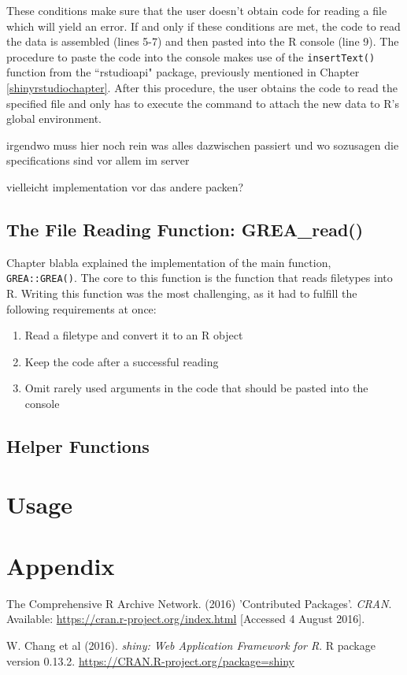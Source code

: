 \documentclass[12pt]{article} %
\newcommand{\li}{\lstinline}
\begin{document}
These conditions make sure that the user doesn't obtain code for reading a file which will yield an error. If and only if these conditions are met, the code to read the data is assembled (lines 5-7)  and then pasted into the R console (line 9). The procedure to paste the code into the console makes use of the \li{insertText()} function from the ``rstudioapi" package, previously mentioned in Chapter \ref{shinyrstudiochapter}. After this procedure, the user obtains the code to read the specified file and only has to execute the command to attach the new data to R's global environment.

irgendwo muss hier noch rein was alles dazwischen passiert und wo sozusagen die specifications sind vor allem im server

vielleicht implementation vor das andere packen?

\subsection{The File Reading Function: \textrm{GREA\_read()}}
Chapter blabla explained the implementation of the main function, \li{GREA::GREA()}. The core to this function is the function that reads filetypes into R.
Writing this function was the most challenging, as it had to fulfill the following requirements at once:
\begin{enumerate}
\item Read a filetype and convert it to an R object
\item Keep the code after a successful reading 
\item Omit rarely used arguments in the code that should be pasted into the console
\end{enumerate}
\subsection{Helper Functions}
\section{Usage}


\clearpage

\section*{Appendix}

\begin{thebibliography}{59}
\begin{singlespace}

The Comprehensive R Archive Network. (2016) 'Contributed Packages'. \emph{CRAN}.
Available: \url{https://cran.r-project.org/index.html} 
[Accessed 4 August 2016].

W. Chang et al (2016).
\emph{shiny: Web Application Framework for R}. R package version 0.13.2.
\url{https://CRAN.R-project.org/package=shiny}

\end{singlespace}
\end{thebibliography}
\end{document}
